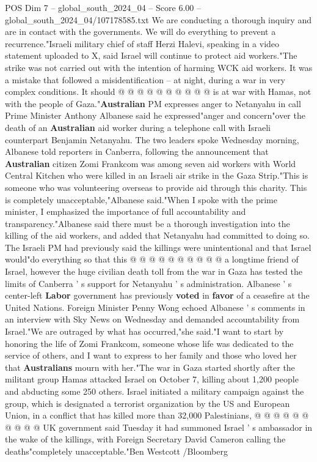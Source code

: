 \begin{textsample}{POS Dim 7 – global\_south\_2024\_04 – Score 6.00 – global\_south\_2024\_04/107178585.txt}
We are conducting a thorough inquiry and are in contact with the governments.
We will do everything to prevent a recurrence."Israeli military chief of staff Herzi Halevi, speaking in a video statement uploaded to X, said Israel will continue to protect aid workers."The strike was not carried out with the intention of harming WCK aid workers.
It was a mistake that followed a misidentification -- at night, during a war in very complex conditions.
It should @ @ @ @ @ @ @ @ @ @ is at war with Hamas, not with the people of Gaza."\textbf{Australian} PM expresses anger to Netanyahu in call Prime Minister Anthony Albanese said he expressed"anger and concern"over the death of an \textbf{Australian} aid worker during a telephone call with Israeli counterpart Benjamin Netanyahu.
The two leaders spoke Wednesday morning, Albanese told reporters in Canberra, following the announcement that \textbf{Australian} citizen Zomi Frankcom was among seven aid workers with World Central Kitchen who were killed in an Israeli air strike in the Gaza Strip."This is someone who was volunteering overseas to provide aid through this charity.
This is completely unacceptable,"Albanese said."When I spoke with the prime minister, I emphasized the importance of full accountability and transparency."Albanese said there must be a thorough investigation into the killing of the aid workers, and added that Netanyahu had committed to doing so.
The Israeli PM had previously said the killings were unintentional and that Israel would"do everything so that this @ @ @ @ @ @ @ @ @ @ a longtime friend of Israel, however the huge civilian death toll from the war in Gaza has tested the limits of Canberra ' s support for Netanyahu ' s administration.
Albanese ' s center-left \textbf{Labor} government has previously \textbf{voted} in \textbf{favor} of a ceasefire at the United Nations.
Foreign Minister Penny Wong echoed Albanese ' s comments in an interview with Sky News on Wednesday and demanded accountability from Israel."We are outraged by what has occurred,"she said."I want to start by honoring the life of Zomi Frankcom, someone whose life was dedicated to the service of others, and I want to express to her family and those who loved her that \textbf{Australians} mourn with her."The war in Gaza started shortly after the militant group Hamas attacked Israel on October 7, killing about 1,200 people and abducting some 250 others.
Israel initiated a military campaign against the group, which is designated a terrorist organization by the US and European Union, in a conflict that has killed more than 32,000 Palestinians, @ @ @ @ @ @ @ @ @ @ UK government said Tuesday it had summoned Israel ' s ambassador in the wake of the killings, with Foreign Secretary David Cameron calling the deaths"completely unacceptable."Ben Westcott /Bloomberg

\end{textsample}
